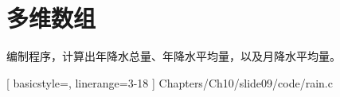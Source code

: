 \section{多维数组}

\begin{frame}[fragile]\ft{\secname} 
编制程序，计算出年降水总量、年降水平均量，以及月降水平均量。
\end{frame}

\begin{frame}[fragile]\ft{\secname} 

[
basicstyle=\footnotesize\ttfamily,
linerange={3-18}
]
{Chapters/Ch10/slide09/code/rain.c}
\end{frame}
